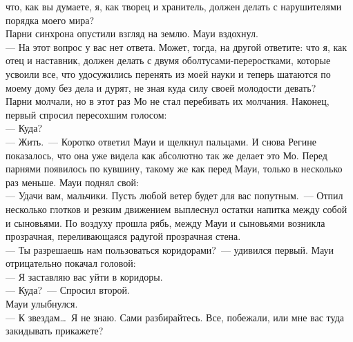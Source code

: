 что, как вы думаете, я, как творец и хранитель, должен делать с нарушителями порядка 
моего мира?\\
Парни синхрона опустили взгляд на землю. Мауи вздохнул.\\
--- На этот вопрос у вас нет ответа. Может, тогда, на другой ответите: что я, как 
отец и наставник, должен делать с двумя оболтусами-переростками, которые 
усвоили все, что удосужились перенять из моей науки и теперь шатаются по моему дому без 
дела и дурят, не зная куда силу своей молодости девать?\\
Парни молчали, но в этот раз Мо не стал перебивать их молчания. Наконец, первый 
спросил пересохшим голосом:\\
--- Куда?\\
--- Жить.~--- Коротко ответил Мауи и щелкнул пальцами. И снова Регине показалось, 
что она уже видела как абсолютно так же делает это Мо. Перед парнями появилось 
по кувшину, такому же как перед Мауи, только в несколько раз меньше. Мауи 
поднял свой:\\
--- Удачи вам, мальчики. Пусть любой ветер будет для вас попутным.~--- Отпил 
несколько глотков и резким движением выплеснул остатки напитка между собой и 
сыновьями. По воздуху прошла рябь, между Мауи и сыновьями возникла прозрачная, 
переливающаяся радугой прозрачная стена.\\
--- Ты разрешаешь нам пользоваться коридорами?~--- удивился первый. Мауи 
отрицательно покачал головой:\\
--- Я заставляю вас уйти в коридоры.\\
--- Куда?~--- Спросил второй.\\
Мауи улыбнулся.\\
--- К звездам\ldots\ Я не знаю. Сами разбирайтесь. Все, побежали, или мне вас 
туда закидывать прикажете?


